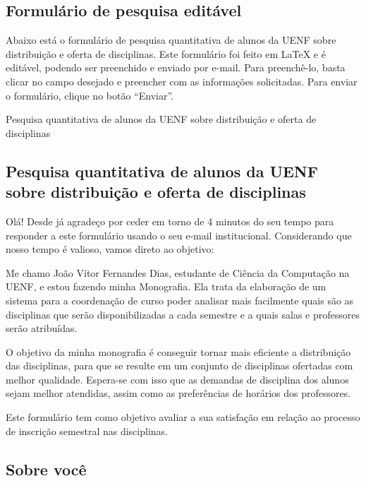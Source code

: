 \begin{apendicesenv}
  \chapter{Formulário de pesquisa editável} \label{apendice:FormularioPesquisaQuantitativaEditavel}

  Abaixo está o formulário de pesquisa quantitativa de alunos da UENF sobre distribuição e oferta de disciplinas. Este formulário foi feito em \LaTeX{} e é editável, podendo ser preenchido e enviado por e-mail. Para preenchê-lo, basta clicar no campo desejado e preencher com as informações solicitadas. Para enviar o formulário, clique no botão ``Enviar''.

  \begin{Form}[action=mailto:joaovitorfd2000@gmail.com, encoding=html, method=post]

    Pesquisa quantitativa de alunos da UENF sobre distribuição e oferta de disciplinas

    \section*{Pesquisa quantitativa de alunos da UENF sobre distribuição e oferta de disciplinas}

    Olá! Desde já agradeço por ceder em torno de 4 minutos do seu tempo para responder a este formulário usando o seu e-mail institucional. Considerando que nosso tempo é valioso, vamos direto ao objetivo:

    Me chamo João Vítor Fernandes Dias, estudante de Ciência da Computação na UENF, e estou fazendo minha Monografia. Ela trata da elaboração de um sistema para a coordenação de curso poder analisar mais facilmente quais são as disciplinas que serão disponibilizadas a cada semestre e a quais salas e professores serão atribuídas.

    O objetivo da minha monografia é conseguir tornar mais eficiente a distribuição das disciplinas, para que se resulte em um conjunto de disciplinas ofertadas com melhor qualidade. Espera-se com isso que as demandas de disciplina dos alunos sejam melhor atendidas, assim como as preferências de horários dos professores.

    Este formulário tem como objetivo avaliar a sua satisfação em relação ao processo de inscrição semestral nas disciplinas.

    \section*{Sobre você}


\end{Form}
\end{apendicesenv}
